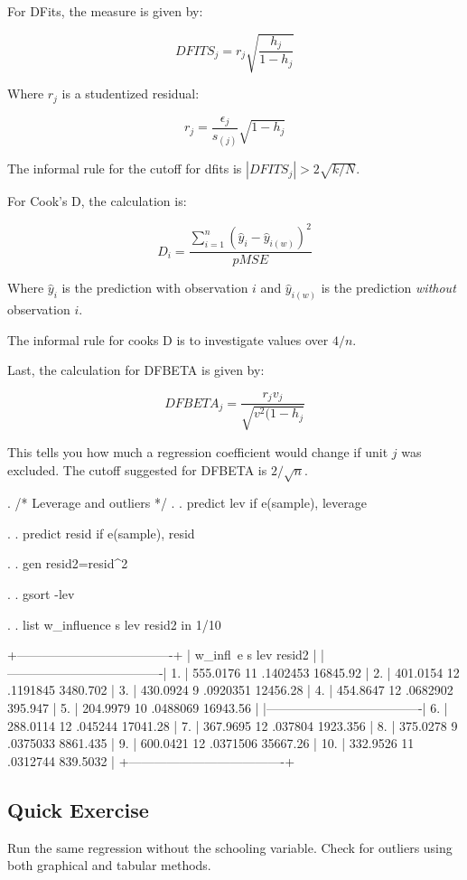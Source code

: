 \documentclass[12pt]{article}
\begin{document}
For DFits, the measure is given by:

\begin{equation*}
  DFITS_j=r_j\sqrt{\frac{h_j}{1-h_j}}
\end{equation*}

Where $r_j$ is a studentized residual:

\begin{equation*}
  r_j=\frac{\epsilon_j}{s_{(j)}}\sqrt{1-h_j}
\end{equation*}

The informal rule for the cutoff for dfits is $|{DFITS_j}|>2 \sqrt{k/N}$.

For Cook's D, the calculation is:

\begin{equation*}
  D_i=\frac{\sum_{i=1}^n(\hat{y}_i-\hat{y}_{i(w)})^2}{p MSE}
\end{equation*}

Where $\hat{y}_i$ is the prediction with observation $i$ and
$\hat{y}_{i(w)}$ is the prediction \emph{without} observation $i$. 

The informal rule for cooks D is to investigate values over $4/n$. 

Last, the calculation for DFBETA is given by: 

\begin{equation*}
  DFBETA_j=\frac{r_jv_j}{\sqrt{v^2(1-h_j}}
\end{equation*}

This tells you how much a regression coefficient would change if unit
$j$ was excluded. The cutoff suggested for DFBETA is $2/\sqrt{n}$. 

\begin{stlog}
. /* Leverage and outliers  */
.   
. predict lev if e(sample), leverage

. 
. predict resid if e(sample), resid

. 
. gen  resid2=resid^2

. 
. gsort -lev

. 
. list w_influence s lev resid2 in 1/10

     +-------------------------------------+
     | w_infl~e    s        lev     resid2 |
     |-------------------------------------|
  1. | 555.0176   11   .1402453   16845.92 |
  2. | 401.0154   12   .1191845   3480.702 |
  3. | 430.0924    9   .0920351   12456.28 |
  4. | 454.8647   12   .0682902    395.947 |
  5. | 204.9979   10   .0488069   16943.56 |
     |-------------------------------------|
  6. | 288.0114   12    .045244   17041.28 |
  7. | 367.9695   12    .037804   1923.356 |
  8. | 375.0278    9   .0375033   8861.435 |
  9. | 600.0421   12   .0371506   35667.26 |
 10. | 332.9526   11   .0312744   839.5032 |
     +-------------------------------------+
\end{stlog}

\subsection{Quick Exercise}

Run the same regression without the schooling variable. Check for
outliers using both graphical and tabular methods. 
\end{document}
